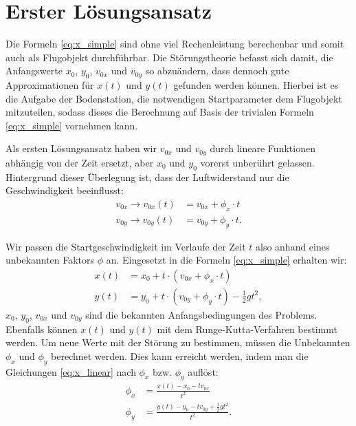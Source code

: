 \section{Erster Lösungsansatz
\label{perturbation:section:ersterloesungsansatz}}

Die Formeln \eqref{eq:x_simple} sind ohne viel Rechenleistung berechenbar und somit auch als Flugobjekt durchführbar.
Die Störungstheorie befasst sich damit, die Anfangswerte $x_0$, $y_0$, $v_{0x}$ und $v_{0y}$ so abzuändern,
dass dennoch gute Approximationen für $x(t)$ und $y(t)$ gefunden werden können.
Hierbei ist es die Aufgabe der Bodenstation, die notwendigen Startparameter dem Flugobjekt mitzuteilen,
sodass dieses die Berechnung auf Basis der trivialen Formeln \ref{eq:x_simple}  vornehmen kann.

Als ersten Lösungsansatz haben wir $v_{0x}$ und $v_{0y}$ durch lineare Funktionen abhängig von der Zeit ersetzt, aber $x_0$ und $y_0$ vorerst unberührt gelassen.
Hintergrund dieser Überlegung ist, dass der Luftwiderstand nur die Geschwindigkeit beeinflusst:
\begin{equation*}
	\begin{aligned}
		v_{0x} \rightarrow v_{0x}(t) &= v_{0x} + \phi_x \cdot t\\
		v_{0y} \rightarrow v_{0y}(t) &= v_{0y} + \phi_y \cdot t.
	\end{aligned}
\end{equation*}



Wir passen die Startgeschwindigkeit im Verlaufe der Zeit $t$ also anhand eines unbekannten Faktors $\phi$ an.
Eingesetzt in die Formeln \eqref{eq:x_simple} erhalten wir:
\begin{equation}\label{eq:x_linear}
\begin{aligned}
    x(t) &= x_0 + t \cdot (v_{0x} + \phi_x \cdot t) \\
    y(t) &= y_0 + t \cdot (v_{0y} + \phi_y \cdot t) - \frac{1}{2}gt^2,
\end{aligned}
\end{equation}
$x_0$, $y_0$, $v_{0x}$ und $v_{0y}$ sind die bekannten Anfangsbedingungen des Problems.
Ebenfalls können $x(t)$ und $y(t)$ mit dem Runge-Kutta-Verfahren bestimmt werden.
Um neue Werte mit der Störung zu bestimmen, müssen die Unbekannten $\phi_x$ und $\phi_y$ berechnet werden.
Dies kann erreicht werden, indem man die Gleichungen \eqref{eq:x_linear} nach $\phi_x$ bzw. $\phi_y$ auflöst:
\begin{equation}
	\begin{aligned}
	\phi_x &= \frac{x(t) - x_0 - tv_{0x}}{t^2}\\
	\phi_y &= \frac{y(t) - y_0 - tv_{0y} + \frac{1}{2}gt^2}{t^2}.
	\end{aligned}
\end{equation}

